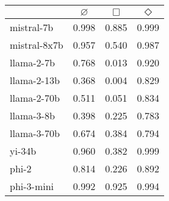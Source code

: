 
\small
\centering
\begin{tabular*}{0.85\columnwidth}{
 @{\extracolsep{\fill}}lccc@{}
 }
 \toprule
  & $\varnothing$ & $\Box$ & $\Diamond$ \\
 \midrule
    mistral-7b & 0.998 & 0.885 & 0.999\\
    mistral-8x7b & 0.957 & 0.540 & 0.987\\
    llama-2-7b & 0.768 & 0.013 & 0.920\\
    llama-2-13b & 0.368 & 0.004 & 0.829\\
    llama-2-70b & 0.511 & 0.051 & 0.834\\
    llama-3-8b & 0.398 & 0.225 & 0.783\\
    llama-3-70b & 0.674 & 0.384 & 0.794\\
    yi-34b & 0.960 & 0.382 & 0.999\\
    phi-2 & 0.814 & 0.226 & 0.892\\
    phi-3-mini & 0.992 & 0.925 & 0.994\\
 \bottomrule
\end{tabular*}